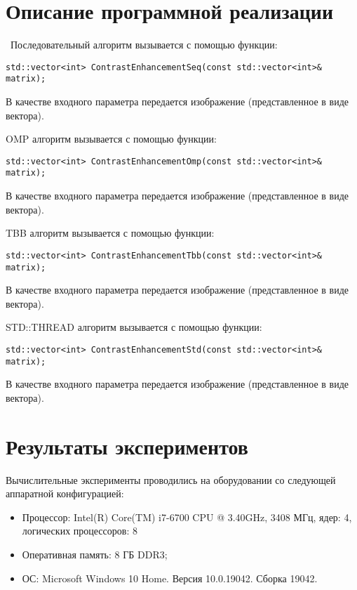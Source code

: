 \documentclass{report}
\begin{document}
\section*{Описание программной реализации}
\
Последовательный алгоритм вызывается с помощью функции:
\begin{lstlisting}
std::vector<int> ContrastEnhancementSeq(const std::vector<int>& matrix);
\end{lstlisting}
\par В качестве входного параметра передается изображение (представленное в виде вектора).
\par OMP алгоритм вызывается с помощью функции:
\begin{lstlisting}
std::vector<int> ContrastEnhancementOmp(const std::vector<int>& matrix);
\end{lstlisting}
\par В качестве входного параметра передается изображение (представленное в виде вектора).
\par TBB алгоритм вызывается с помощью функции:
\begin{lstlisting}
std::vector<int> ContrastEnhancementTbb(const std::vector<int>& matrix);
\end{lstlisting}
\par В качестве входного параметра передается изображение (представленное в виде вектора).
\par STD::THREAD алгоритм вызывается с помощью функции:
\begin{lstlisting}
std::vector<int> ContrastEnhancementStd(const std::vector<int>& matrix);
\end{lstlisting}
\par В качестве входного параметра передается изображение (представленное в виде вектора).
\newpage

\section*{Результаты экспериментов}
Вычислительные эксперименты проводились на оборудовании со следующей аппаратной конфигурацией:

\begin{itemize}
\item Процессор: Intel(R) Core(TM) i7-6700 CPU @ 3.40GHz, 3408 МГц, ядер: 4, логических процессоров: 8
\item Оперативная память: 8 ГБ DDR3;
\item ОС: Microsoft Windows 10 Home. Версия 10.0.19042. Сборка 19042.
\end{itemize}
\end{document}
